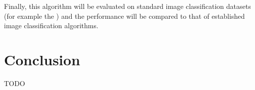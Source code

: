 \documentclass[a4paper,12pt]{article} %
\begin{document}
Finally, this algorithm will be evaluated on standard image classification datasets (for example the ) and the performance will be compared to that of established image classification algorithms.

\section{Conclusion}

TODO

\clearpage
 

\end{document}

